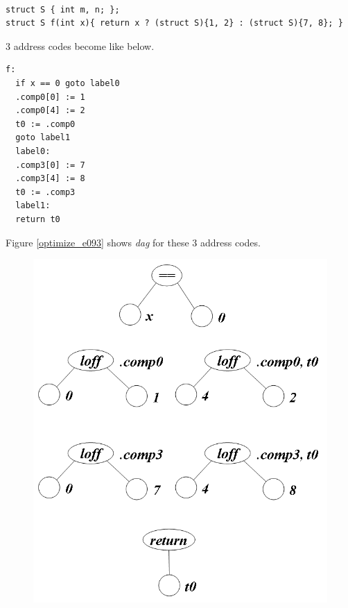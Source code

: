 \begin{Example}
\label{optimize_e092}
\begin{verbatim}

struct S { int m, n; };
struct S f(int x){ return x ? (struct S){1, 2} : (struct S){7, 8}; }
\end{verbatim}
3 address codes become like below.
\begin{verbatim}
f:
  if x == 0 goto label0
  .comp0[0] := 1
  .comp0[4] := 2
  t0 := .comp0
  goto label1
  label0:
  .comp3[0] := 7
  .comp3[4] := 8
  t0 := .comp3
  label1:
  return t0
\end{verbatim}
Figure \ref{optimize_e093} shows {\em dag} for these 3 address codes.
\begin{figure}[htbp]
\begin{center}
\begin{htmlonly}
\includegraphics[width=0.857\linewidth,height=1.0\linewidth]{opt040.png}
\end{htmlonly}
\begin{latexonly}

\end{latexonly}
\end{center}
\end{figure}
\end{Example}
